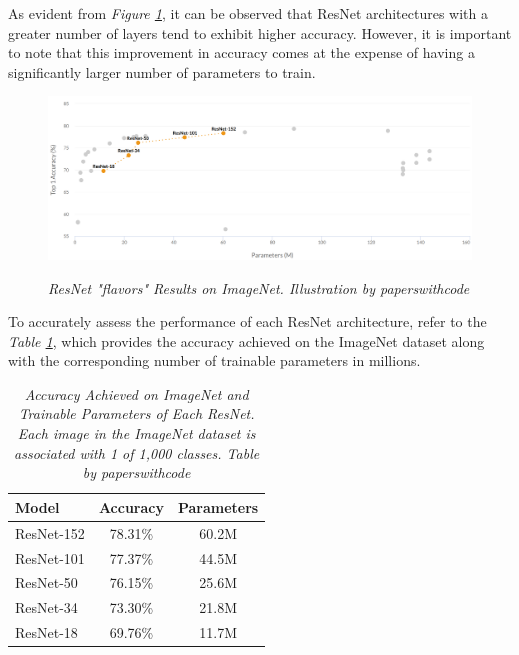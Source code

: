 \newpage

As evident from \textit{Figure \ref{fig:resnet}}, it can be observed that ResNet architectures with a greater number of layers tend to exhibit higher accuracy. However, it is important to note that this improvement in accuracy comes at the expense of having a significantly larger number of parameters to train.


\begin{figure}[H]
\begin{adjustbox}{width=\textwidth, trim={0pt 0pt 1cm 0pt}, clip}
\centering
\includegraphics[width=\textwidth]{imatges/preliminaries/ResNetImageNet.png}
\end{adjustbox}
\caption[ResNet "flavors" Results on ImageNet]{\textit{ResNet "flavors" Results on ImageNet. Illustration by paperswithcode}}
{\label{fig:resnet}}
\end{figure}

To accurately assess the performance of each ResNet architecture, refer to the \textit{Table \ref{table:resnet}}, which provides the accuracy achieved on the ImageNet dataset along with the corresponding number of trainable parameters in millions.

\begin{table}[H]
\centering
\begin{tabular}{lcc}
\toprule
\textbf{Model} & \textbf{Accuracy} & \textbf{Parameters} \\
 \midrule
ResNet-152 & 78.31\% & 60.2M \\
ResNet-101 & 77.37\% & 44.5M \\
ResNet-50 & 76.15\% & 25.6M \\
ResNet-34 & 73.30\% & 21.8M \\
ResNet-18 & 69.76\% & 11.7M \\ \bottomrule
\end{tabular}
\caption[Accuracy Achieved on ImageNet and Trainable Parameters of Each ResNet.]
 {\textit{Accuracy Achieved on ImageNet and Trainable Parameters of Each ResNet.
  Each image in the ImageNet dataset is associated with 1 of 1,000 classes. Table by paperswithcode}}
{\label{table:resnet}}
\end{table}

